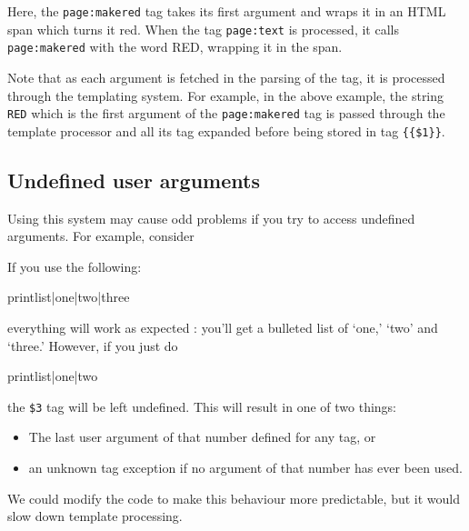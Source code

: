 
Here, the \texttt{page:makered} tag takes its first argument and wraps it in an HTML span which turns it red. When the
tag \texttt{page:text} is processed, it calls \texttt{page:makered} with the word RED, wrapping it in the span.

Note that as each argument is fetched in the parsing of the tag, it is processed through the templating system. For example,
in the above example, the string \texttt{RED} which is the first argument of the \texttt{page:makered} tag is passed through
the template processor and all its tag expanded before being stored in tag \verb,{{$1}},.

\subsection{Undefined user arguments}
Using this system may cause odd problems if you try to access undefined arguments. For example, consider
\begin{MyVerbatim}
printlist = [[
<ul>
  <li>{{$1}}</li>
  <li>{{$2}}</li>
  <li>{{$3}}</li>
</ul>
\end{MyVerbatim}
If you use the following:
\begin{MyVerbatim}
{{printlist|one|two|three}}
\end{MyVerbatim}
everything will work as expected : you'll get a bulleted list of `one,' `two' and `three.' However, if you just do
\begin{MyVerbatim}
{{printlist|one|two}}
\end{MyVerbatim}
the \verb,$3, tag will be left undefined. This will result in one of two things:
\begin{itemize}
\item The last user argument of that number defined for any tag, or
\item an unknown tag exception if no argument of that number has ever been used.
\end{itemize}
We could modify the code to make this behaviour more predictable, but it would slow down template processing.

